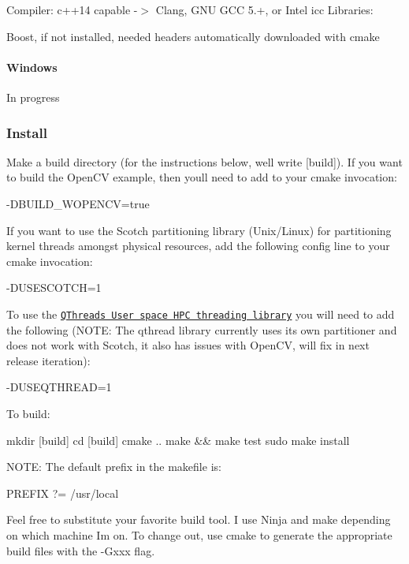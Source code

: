 Compiler\+: c++14 capable -\/$>$ Clang, G\+NU G\+CC 5.+, or Intel icc Libraries\+:
\begin{DoxyItemize}
\item Boost, if not installed, needed headers automatically downloaded with cmake
\end{DoxyItemize}

\paragraph*{Windows}

In progress

\subsubsection*{Install}

Make a build directory (for the instructions below, we\textquotesingle{}ll write \mbox{[}build\mbox{]}). If you want to build the Open\+CV example, then you\textquotesingle{}ll need to add to your cmake invocation\+: 
\begin{DoxyCode}
-DBUILD\_WOPENCV=true 
\end{DoxyCode}
 If you want to use the Scotch partitioning library (Unix/\+Linux) for partitioning kernel threads amongst physical resources, add the following config line to your cmake invocation\+: 
\begin{DoxyCode}
-DUSESCOTCH=1
\end{DoxyCode}


To use the \href{http://www.cs.sandia.gov/qthreads/}{\tt Q\+Threads User space H\+PC threading library} you will need to add the following (N\+O\+TE\+: The qthread library currently uses its own partitioner and does not work with Scotch, it also has issues with Open\+CV, will fix in next release iteration)\+: 
\begin{DoxyCode}
-DUSEQTHREAD=1
\end{DoxyCode}


To build\+:


\begin{DoxyCode}
mkdir [build]
cd [build]
cmake ..
make && make test
sudo make install
\end{DoxyCode}
 N\+O\+TE\+: The default prefix in the makefile is\+: 
\begin{DoxyCode}
PREFIX ?= /usr/local
\end{DoxyCode}
 Feel free to substitute your favorite build tool. I use Ninja and make depending on which machine I\textquotesingle{}m on. To change out, use cmake to generate the appropriate build files with the -\/\+Gxxx flag.

